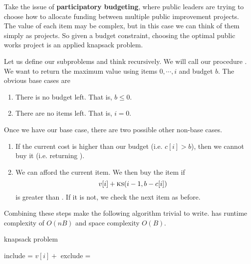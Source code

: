 \documentclass[titlepage, 12pt, leqno]{article}
\begin{document}
Take the issue of \textbf{participatory budgeting}, where public leaders are
trying to choose how to allocate funding between multiple public improvement
projects. The value of each item may be complex, but in this case we can think
of them simply as projects. So given a budget constraint, choosing the optimal
public works project is an applied knapsack problem.

Let us define our subproblems and think recursively. We will call our procedure
. We want  to return the maximum value using items
$0, \cdots ,i$ and budget $b$. The obvious base cases are
\begin{enumerate}
    \item There is no budget left. That is, $b \le 0$.
    \item There are no items left. That is, $i=0$.
\end{enumerate}
Once we have our base case, there are two possible other non-base cases.
\begin{enumerate}
    \item If the current cost is higher than our budget (i.e. $c[i]>b$), then
        we cannot buy it (i.e. returning ).
    \item We can afford the current item. We then buy the item if 
        \[
            v[i] + \text{\Call{ks}{$i-1, b-c[i]$}}
        \]
        is greater than . If it is not, we check the next
        item as before.
\end{enumerate}
Combining these steps make the following algorithm trivial to write.
 has runtime complexity of $O(nB)$ and space complexity $O(B)$.

\begin{algorithm}
\caption{knapsack problem}
\begin{algorithmic}[1]
        \State {}
        \State \Return {}
    \Else
    \State include = $v[i] +$ 
    \State exclude = 
    \EndIf
    \State \Return {}
\EndProcedure
\end{algorithmic}
\end{algorithm}
\end{document}
